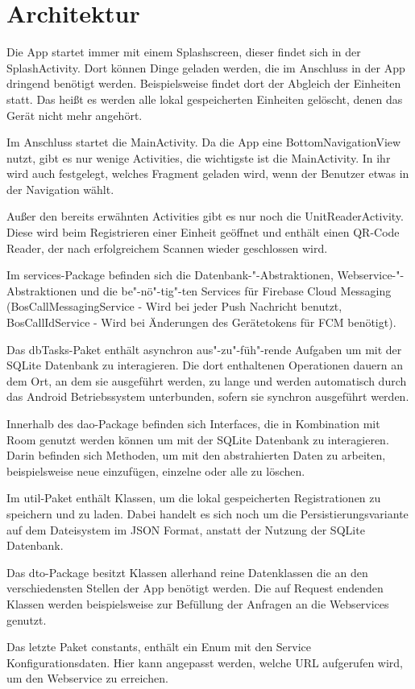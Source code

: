 \section{Architektur}
Die App startet immer mit einem Splashscreen, dieser findet sich in der SplashActivity. Dort können Dinge geladen werden, die im Anschluss in der App dringend benötigt werden. Beispielsweise findet dort der Abgleich der Einheiten statt. Das heißt es werden alle lokal gespeicherten Einheiten gelöscht, denen das Gerät nicht mehr angehört.

Im Anschluss startet die MainActivity. Da die App eine BottomNavigationView nutzt, gibt es nur wenige Activities, die wichtigste ist die MainActivity. In ihr wird auch festgelegt, welches Fragment geladen wird, wenn der Benutzer etwas in der Navigation wählt. 

Außer den bereits erwähnten Activities gibt es nur noch die UnitReaderActivity. Diese wird beim Registrieren einer Einheit geöffnet und enthält einen QR-Code Reader, der nach erfolgreichem Scannen wieder geschlossen wird.

Im services-Package befinden sich die Datenbank-"-Abstraktionen, Webservice-"-Abstraktionen und die be"-nö"-tig"-ten Services für Firebase Cloud Messaging (BosCallMessagingService - Wird bei jeder Push Nachricht benutzt, BosCallIdService - Wird bei Änderungen des Gerätetokens für FCM benötigt).

Das dbTasks-Paket enthält asynchron aus"-zu"-füh"-rende Aufgaben um mit der SQLite Datenbank zu interagieren. Die dort enthaltenen Operationen dauern an dem Ort, an dem sie ausgeführt werden, zu lange und werden automatisch durch das Android Betriebssystem unterbunden, sofern sie synchron ausgeführt werden.

Innerhalb des dao-Package befinden sich Interfaces, die in Kombination mit Room genutzt werden können um mit der SQLite Datenbank zu interagieren. Darin befinden sich Methoden, um mit den abstrahierten Daten zu arbeiten, beispielsweise neue einzufügen, einzelne oder alle zu löschen.

Im util-Paket enthält Klassen, um die lokal gespeicherten Registrationen zu speichern und zu laden. Dabei handelt es sich noch um die Persistierungsvariante auf dem Dateisystem im JSON Format, anstatt der Nutzung der SQLite Datenbank.

Das dto-Package besitzt Klassen allerhand reine Datenklassen die an den verschiedensten Stellen der App benötigt werden. Die auf Request endenden Klassen werden beispielsweise zur Befüllung der Anfragen an die Webservices genutzt.

Das letzte Paket constants, enthält ein Enum mit den Service Konfigurationsdaten. Hier kann angepasst werden, welche URL aufgerufen wird, um den Webservice zu erreichen.
